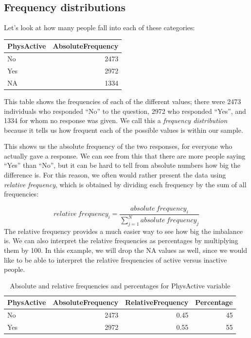 \documentclass[12pt,]{book}
\theoremstyle{definition}
\theoremstyle{definition}
\theoremstyle{definition}
\theoremstyle{remark}
\begin{document}
\hypertarget{frequency-distributions}{%
\subsection{Frequency distributions}\label{frequency-distributions}}

Let's look at how many people fall into each of these categories:

\begin{tabular}{l|r}
\hline
PhysActive & AbsoluteFrequency\\
\hline
No & 2473\\
\hline
Yes & 2972\\
\hline
NA & 1334\\
\hline
\end{tabular}

This table shows the frequencies of each of the different values; there were 2473 individuals who responded ``No'' to the question, 2972 who responded ``Yes'', and 1334 for whom no response was given. We call this a \emph{frequency distribution} because it tells us how frequent each of the possible values is within our sample.

This shows us the absolute frequency of the two responses, for everyone who actually gave a response. We can see from this that there are more people saying ``Yes'' than ``No'', but it can be hard to tell from absolute numbers how big the difference is. For this reason, we often would rather present the data using \emph{relative frequency}, which is obtained by dividing each frequency by the sum of all frequencies:

\[
relative\ frequency_i = \frac{absolute\ frequency_i}{\sum_{j=1}^N absolute\ frequency_j}
\]
The relative frequency provides a much easier way to see how big the imbalance is. We can also interpret the relative frequencies as percentages by multiplying them by 100. In this example, we will drop the NA values as well, since we would like to be able to interpret the relative frequencies of active versus inactive people.

\begin{table}

\caption{\label{tab:unnamed-chunk-5}Absolute and relative frequencies and percentages for PhysActive variable}
\centering
\begin{tabular}[t]{l|r|r|r}
\hline
PhysActive & AbsoluteFrequency & RelativeFrequency & Percentage\\
\hline
No & 2473 & 0.45 & 45\\
\hline
Yes & 2972 & 0.55 & 55\\
\hline
\end{tabular}
\end{table}
\end{document}
